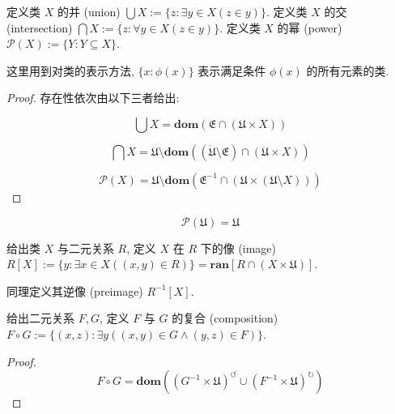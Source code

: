 \begin{definition}
    \label{definition:union of classes}
    定义类 \(X\) 的并 (union) \(\bigcup X := \{z : \exists y \in X (z \in y)\}\).
    \label{definition:intersection of classes}
    定义类 \(X\) 的交 (intersection) \(\bigcap X := \{z : \forall y \in X (z \in y)\}\).
    \label{definition:power class}
    定义类 \(X\) 的幂 (power) \(\mathcal{P} (X) := \{Y : Y \subseteq X\}\).

    这里用到对类的表示方法, \(\{x : \phi (x)\}\) 表示满足条件 \(\phi (x)\) 的所有元素的类.

    \begin{proof}
        存在性依次由以下三者给出:

        \[
            \bigcup X = \mathbf{dom} (\mathfrak{E} \cap (\mathfrak{U} \times X))
        \]

        \[
            \bigcap X = \mathfrak{U} \setminus \mathbf{dom} ((\ddot {\mathfrak{U}} \setminus \mathfrak{E}) \cap (\mathfrak{U} \times X))
        \]

        \[
            \mathcal{P} (X) = \mathfrak{U} \setminus \mathbf{dom} (\mathfrak{E}^{-1} \cap (\mathfrak{U} \times (\mathfrak{U} \setminus X)))
        \]
    \end{proof}
\end{definition}

\begin{corollary}
    \[
        \mathcal{P} (\mathfrak{U}) = \mathfrak{U}
    \]
\end{corollary}

\begin{definition}
    \label {definition:image of a class}
    给出类 \(X\) 与二元关系 \(R\), 定义 \(X\) 在 \(R\) 下的像 (image) \(R[X] := \{y : \exists x \in X ((x,y) \in R)\} = \mathbf{ran} [R \cap (X \times \mathfrak{U})]\).

    \label {definition:preimage of a class}
    同理定义其逆像 (preimage) \(R^{-1}[X]\).
\end{definition}

\begin{definition}
    \label {definition:composition of two classes}
    给出二元关系 \(F, G\), 定义 \(F\) 与 \(G\) 的复合 (composition) \(F \circ G := \{(x,z) : \exists y ((x,y) \in G \land (y,z) \in F)\}\).

    \begin{proof}
        \[
            F \circ G = \mathbf{dom} ({(G^{-1} \times \mathfrak{U})}^{\circlearrowleft} \cup {(F^{-1} \times \mathfrak{U})}^{\circlearrowright})
        \]
    \end{proof}
\end{definition}

